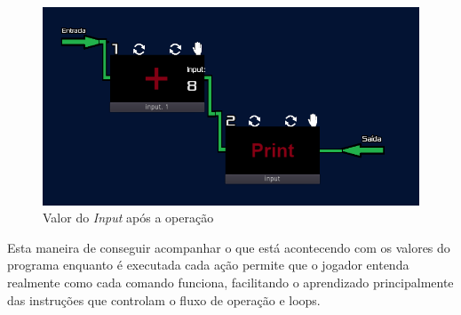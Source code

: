 \begin{figure}[H]
    \includegraphics[width=\textwidth]{../figuras/depois_da_soma.png}
    \caption{Valor do \textit{Input} após a opera\c{c}\~{a}o}
\end{figure}

Esta maneira de conseguir acompanhar o que está acontecendo com os valores do 
programa enquanto é executada cada ação permite que o jogador entenda realmente
como cada comando funciona, facilitando o aprendizado principalmente das 
instruções que controlam o fluxo de operação e loops.

